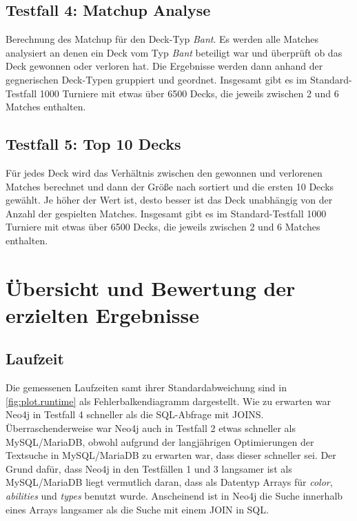 \subsection{Testfall 4: Matchup Analyse}
Berechnung des Matchup für den Deck-Typ \emph{Bant}. Es werden alle Matches analysiert an denen ein Deck vom Typ \emph{Bant} beteiligt war und überprüft ob das Deck gewonnen oder verloren hat. Die Ergebnisse werden dann anhand der gegnerischen Deck-Typen gruppiert und geordnet. Insgesamt gibt es im Standard-Testfall 1000 Turniere mit etwas über 6500 Decks, die jeweils zwischen 2 und 6 Matches enthalten.  

\subsection{Testfall 5: Top 10 Decks}
Für jedes Deck wird das Verhältnis zwischen den gewonnen und verlorenen Matches berechnet und dann der Größe nach sortiert und die ersten 10 Decks gewählt. Je höher der Wert ist, desto besser ist das Deck unabhängig von der Anzahl der gespielten Matches. Insgesamt gibt es im Standard-Testfall 1000 Turniere mit etwas über 6500 Decks, die jeweils zwischen 2 und 6 Matches enthalten. 

\section{Übersicht und Bewertung der erzielten Ergebnisse}
\subsection{Laufzeit}
Die gemessenen Laufzeiten samt ihrer Standardabweichung sind in \autoref{fig:plot.runtime} als Fehlerbalkendiagramm dargestellt.
Wie zu erwarten war Neo4j in Testfall 4 schneller als die SQL-Abfrage mit JOINS. Überraschenderweise war Neo4j auch in Testfall 2 etwas schneller als MySQL/MariaDB, obwohl aufgrund der langjährigen Optimierungen der Textsuche in MySQL/MariaDB zu erwarten war, dass dieser schneller sei.
Der Grund dafür, dass Neo4j in den Testfällen 1 und 3 langsamer ist als MySQL/MariaDB liegt vermutlich daran, dass als Datentyp Arrays für \emph{color}, \emph{abilities} und \emph{types} benutzt wurde. Anscheinend ist in Neo4j die Suche innerhalb eines Arrays langsamer als die Suche mit einem JOIN in SQL.

